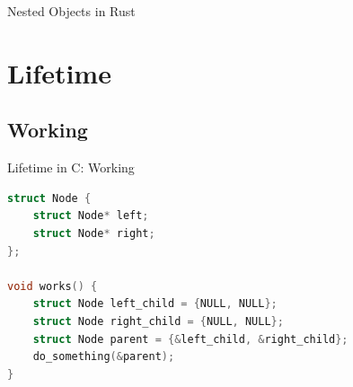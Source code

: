 \begin{Frame}{Nested Objects in Rust}
  \centerline{%
  }
\end{Frame}

\section{Lifetime}

\subsection{Working}

\begin{Frame}[fragile]{Lifetime in C: Working}
\begin{lstlisting}[language=C]
struct Node {
    struct Node* left;
    struct Node* right;
};

void works() {
    struct Node left_child = {NULL, NULL};
    struct Node right_child = {NULL, NULL};
    struct Node parent = {&left_child, &right_child};
    do_something(&parent);
}
\end{lstlisting}
\end{Frame}


